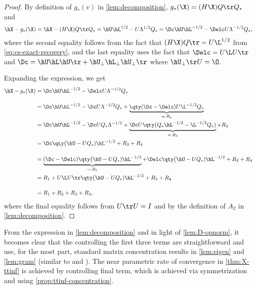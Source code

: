 \documentclass[10pt]{article}
\begin{document}
\begin{proof}
By definition of $g_*(v)$ in \cref{lem:decomposition}, $g_*(\X) = (H\X)Q\tr Q_*$ and
\begin{align}
    \hX - g_*(\X) = \hX - (H\X)Q\tr Q_* = \hU \hL^{1/2} - U\Lambda^{1/2}Q_* = \Dc \hU \hL^{-1/2} - \Delc U\Lambda^{-1/2}Q_*,
\end{align}
where the second equality follows from the fact that $(H\X)Q\tr = U\L^{1/2}$ from \cref{eq:cs-exact-recovery}, and the last equality uses the fact that $\Delc = U\L U\tr$ and $\Dc = \hU\hL\hU\tr + \hU_\perp\hL_\perp\hU_\perp\tr$ where $\hU_\perp\tr U = \O$. 

Expanding the expression, we get
\begin{align}
    \hX - g_*(\X)
    &= \Dc \hU \hL^{-1/2} - \Delc U\Lambda^{-1/2}Q_* {\phantom{\underbrace{1}_{1}}}\\
    &= \Dc \hU \hL^{-1/2} - \Dc U\Lambda^{-1/2}Q_* + \underbrace{ \qty(\Dc - \Delc) U\L^{-1/2}Q_* }_{=: R_4} \\
    &= \Dc \hU \hL^{-1/2} - \Dc UQ_*\Lambda^{-1/2} + \underbrace{\Dc U \qty\big( Q_*\hL^{-1/2} - \L^{-1/2}Q_* )}_{=:R_3} + {R_4} \\
    &= \Dc \qty\big(\hU - UQ_*) \hL^{-1/2} + R_3 + R_4 {\phantom{\underbrace{1}_{1}}}\\
    &= \underbrace{(\Dc - \Delc) \qty\big(\hU - UQ_*) \hL^{-1/2}}_{=:R_1} + \Delc \qty\big(\hU - UQ_*) \hL^{-1/2} + R_3 + R_4 \\
    &= R_1 + U\L U\tr\qty\big(\hU - UQ_*) \hL^{-1/2} + R_3 + R_4 {\phantom{\underbrace{1}_{1}}}\\
    &= R_1 + R_2 + R_3 + R_4,
\end{align}
where the final equality follows from $U\tr U = I$ and by the definition of $A_2$ in \cref{lem:decomposition}.
\end{proof}


From the expression in \cref{lem:decomposition} and in light of \cref{lem:D-opnorm}, it becomes clear that the controlling the first three terms are straightforward and use, for the most part, standard matrix concentration results in \cref{lem:eigen} and \cref{lem:gram} (similar to \citet{li2020central} and \citet{little2023analysis}). The near parametric rate of convergence in \cref{thm:X-ttinf} is achieved by controlling final term, which is achieved via symmetrization and using \cref{prop:ttinf-concentration}.
\end{document}
